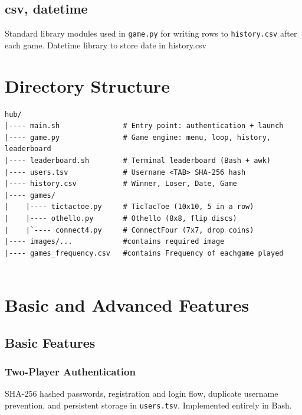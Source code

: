 \documentclass[12pt, letterpaper]{article}
\begin{document}
\subsection{csv, datetime}
Standard library modules used in \texttt{game.py} for writing rows to
\texttt{history.csv} after each game. Datetime library to store date in history.csv

\section{Directory Structure}

\begin{lstlisting}[style=bashstyle]
hub/
|---- main.sh               # Entry point: authentication + launch
|---- game.py               # Game engine: menu, loop, history, leaderboard
|---- leaderboard.sh        # Terminal leaderboard (Bash + awk)
|---- users.tsv             # Username <TAB> SHA-256 hash
|---- history.csv           # Winner, Loser, Date, Game
|---- games/
|    |---- tictactoe.py     # TicTacToe (10x10, 5 in a row)
|    |---- othello.py       # Othello (8x8, flip discs)
|    |`---- connect4.py     # ConnectFour (7x7, drop coins)
|---- images/...            #contains required image
|---- games_frequency.csv   #contains Frequency of eachgame played


\end{lstlisting}

\section{Basic and Advanced Features}

\subsection{Basic Features}

\subsubsection*{Two-Player Authentication}
SHA-256 hashed passwords, registration and login flow, duplicate username
prevention, and persistent storage in \texttt{users.tsv}. Implemented
entirely in Bash.
\end{document}
